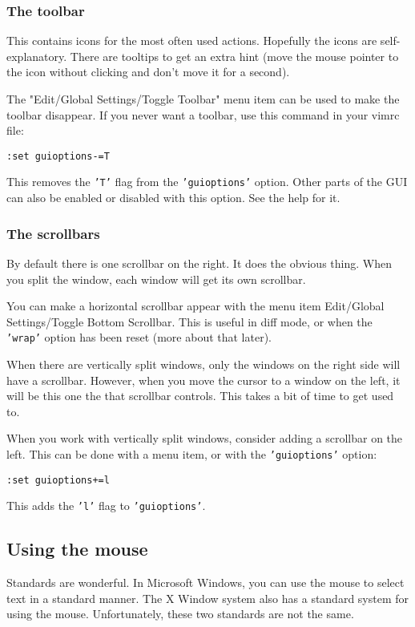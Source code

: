 \subsubsection{The toolbar}
This contains icons for the most often used actions.
Hopefully the icons are self-explanatory.
There are tooltips to get an extra hint (move the mouse pointer to the icon without clicking and don't move it for a second).

The "Edit/Global Settings/Toggle Toolbar" menu item can be used to make the toolbar disappear.
If you never want a toolbar, use this command in your vimrc file:

 \begin{Verbatim}[samepage=true]
 :set guioptions-=T
 \end{Verbatim}

This removes the \texttt{'T'} flag from the \texttt{'guioptions'} option.
Other parts of the GUI can also be enabled or disabled with this option.
See the help for it.

\subsubsection{The scrollbars}
By default there is one scrollbar on the right.
It does the obvious thing.
When you split the window, each window will get its own scrollbar.

You can make a horizontal scrollbar appear with the menu item Edit/Global Settings/Toggle Bottom Scrollbar.
This is useful in diff mode, or when the \texttt{'wrap'} option has been reset (more about that later).

When there are vertically split windows, only the windows on the right side will have a scrollbar.
However, when you move the cursor to a window on the left, it will be this one the that scrollbar controls.
This takes a bit of time to get used to.

When you work with vertically split windows, consider adding a scrollbar on the left.
This can be done with a menu item, or with the \texttt{'guioptions'} option:

 \begin{Verbatim}[samepage=true]
 :set guioptions+=l
 \end{Verbatim}

This adds the \texttt{'l'} flag to \texttt{'guioptions'}.
\subsection{Using the mouse}
Standards are wonderful.
In Microsoft Windows, you can use the mouse to select text in a standard manner.
The X Window system also has a standard system for using the mouse.
Unfortunately, these two standards are not the same.

